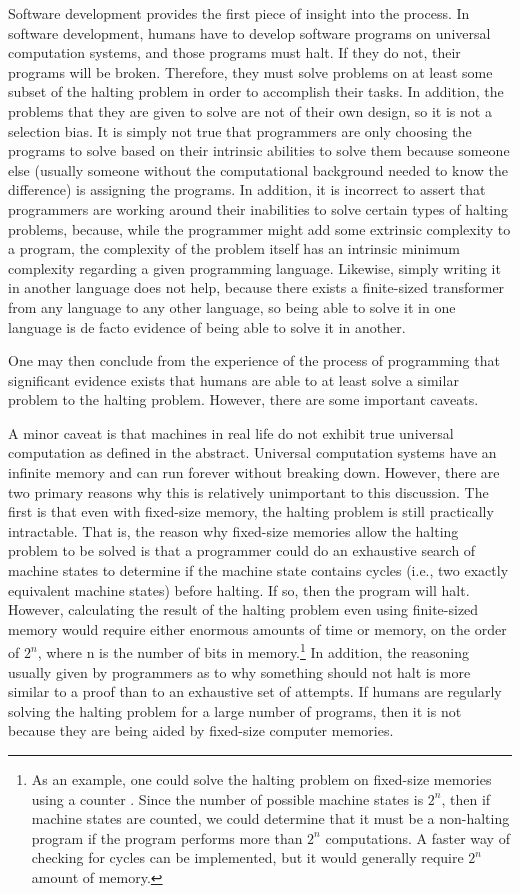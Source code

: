 Software development provides the first piece of insight into the process. In software development, humans have to develop software programs on universal computation systems, and those programs must halt.  If they do not, their programs will be broken.  Therefore, they must solve problems on at least some subset of the halting problem in order to accomplish their tasks.  In addition, the problems that they are given to solve are not of their own design, so it is not a selection bias.  It is simply not true that programmers are only choosing the programs to solve based on their intrinsic abilities to solve them because someone else (usually someone without the computational background needed to know the difference) is assigning the programs.  In addition, it is incorrect to assert that programmers are working around their inabilities to solve certain types of halting problems, because, while the programmer might add some extrinsic complexity to a program, the complexity of the problem itself has an intrinsic minimum complexity regarding a given programming language.  Likewise, simply writing it in another language does not help, because there exists a finite-sized transformer from any language to any other language, so being able to solve it in one language is de facto evidence of being able to solve it in another.

One may then conclude from the experience of the process of programming that significant evidence exists that humans are able to at least solve a similar problem to the halting problem.  However, there are some important caveats.

A minor caveat is that machines in real life do not exhibit true universal computation as defined in the abstract.  Universal computation systems have an infinite memory and can run forever without breaking down.  However, there are two primary reasons why this is relatively unimportant to this discussion.  The first is that even with fixed-size memory, the halting problem is still practically intractable.  That is, the reason why fixed-size memories allow the halting problem to be solved is that a programmer could do an exhaustive search of machine states to determine if the machine state contains cycles (i.e., two exactly equivalent machine states) before halting.  If so, then the program will halt.  However, calculating the result of the halting problem even using finite-sized memory would require either enormous amounts of time or memory, on the order of $2^n$, where n is the number of bits in memory.\footnote{As an example, one could solve the halting problem on fixed-size memories using a counter \citep{gurari1989}.  Since the number of possible machine states is $2^n$, then if machine states are counted, we could determine that it must be a non-halting program if the program performs more than $2^n$ computations.  A faster way of checking for cycles can be implemented, but it would generally require $2^n$ amount of memory.}  In addition, the reasoning usually given by programmers as to why something should not halt is more similar to a proof than to an exhaustive set of attempts.  If humans are regularly solving the halting problem for a large number of programs, then it is not because they are being aided by fixed-size computer memories.

